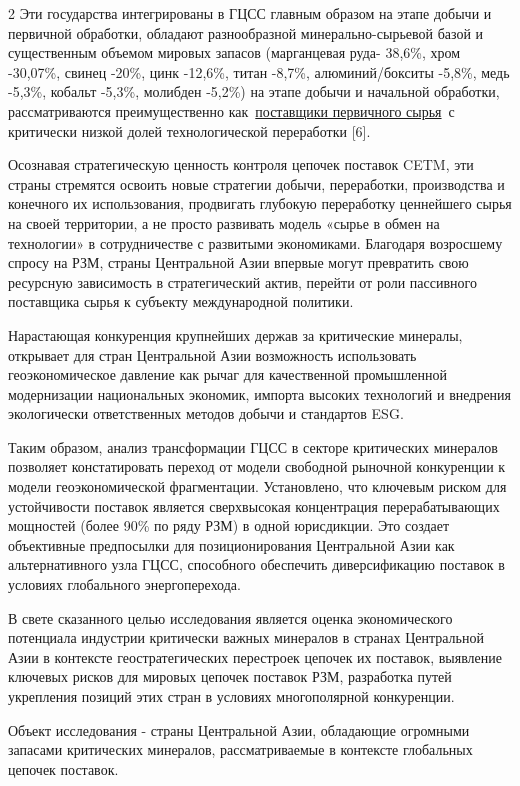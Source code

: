 \begin{multicols}{2}
Эти государства интегрированы в ГЦСС главным образом на этапе добычи и
первичной обработки, обладают разнообразной минерально-сырьевой базой и
существенным объемом мировых запасов (марганцевая руда- 38,6\%, хром
-30,07\%, свинец -20\%, цинк -12,6\%, титан -8,7\%, алюминий/бокситы
-5,8\%, медь -5,3\%, кобальт -5,3\%, молибден -5,2\%) на этапе добычи и
начальной обработки, рассматриваются преимущественно
как~\href{https://t.me/tengenomika/8850}{поставщики первичного сырья}~с
критически низкой долей технологической переработки {[}6{]}.

Осознавая стратегическую ценность контроля цепочек поставок CETM, эти
страны стремятся освоить новые стратегии добычи, переработки,
производства и конечного их использования, продвигать глубокую
переработку ценнейшего сырья на своей территории, а не просто развивать
модель «сырье в обмен на технологии» в сотрудничестве с развитыми
экономиками. Благодаря возросшему спросу на РЗМ, страны Центральной Азии
впервые могут превратить свою ресурсную зависимость в стратегический
актив, перейти от роли пассивного поставщика сырья к субъекту
международной политики.

Нарастающая конкуренция крупнейших держав за критические минералы,
открывает для стран Центральной Азии возможность использовать
геоэкономическое давление как рычаг для качественной промышленной
модернизации национальных экономик, импорта высоких технологий и
внедрения экологически ответственных методов добычи и стандартов ESG.

Таким образом, анализ трансформации ГЦСС в секторе критических минералов
позволяет констатировать переход от модели свободной рыночной
конкуренции к модели геоэкономической фрагментации. Установлено, что
ключевым риском для устойчивости поставок является сверхвысокая
концентрация перерабатывающих мощностей (более 90\% по ряду РЗМ) в одной
юрисдикции. Это создает объективные предпосылки для позиционирования
Центральной Азии как альтернативного узла ГЦСС, способного обеспечить
диверсификацию поставок в условиях глобального энергоперехода.

В свете сказанного целью исследования является оценка экономического
потенциала индустрии критически важных минералов в странах Центральной
Азии в контексте геостратегических перестроек цепочек их поставок,
выявление ключевых рисков для мировых цепочек поставок РЗМ, разработка
путей укрепления позиций этих стран в условиях многополярной
конкуренции.

Объект исследования - страны Центральной Азии, обладающие огромными
запасами критических минералов, рассматриваемые в контексте глобальных
цепочек поставок.


\end{multicols}
